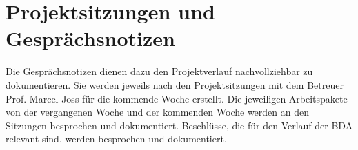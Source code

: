 \section{Projektsitzungen und Gesprächsnotizen}
Die Gesprächsnotizen dienen dazu den  Projektverlauf nachvollziehbar zu dokumentieren. Sie werden jeweils nach den Projektsitzungen mit dem Betreuer Prof. Marcel Joss für die kommende Woche erstellt. Die jeweiligen Arbeitspakete von der vergangenen Woche und der kommenden Woche werden an den Sitzungen besprochen und dokumentiert. Beschlüsse, die für den Verlauf der BDA relevant sind, werden besprochen und dokumentiert.



